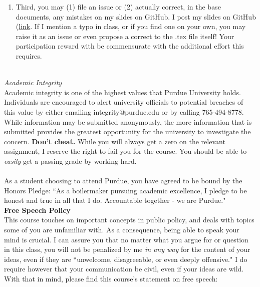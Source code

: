 \documentclass[a4paper]{article}
\begin{document}
\begin{itemize}
\begin{itemize}
\begin{enumerate}
\item Third, you may (1) file an issue or (2) actually correct, in the base documents, any mistakes on my slides on GitHub.  I post my slides on GitHub (\href{https://github.com/trevorsgallen/Intermediate-Macroeconomics}{link}.  If I mention a typo in class, or if you find one on your own, you may raise it as an issue or even propose a correct to the .tex file itself!  Your participation reward with be commensurate with the additional effort this requires.
\end{enumerate}
\end{itemize}
\end{itemize}
\ \\

\emph{Academic Integrity}\\
Academic integrity is one of the highest values that Purdue University holds. Individuals are encouraged to alert university officials to potential breaches of this value by either emailing integrity@purdue.edu or by calling 765-494-8778.  While information may be submitted anonymously, the more information that is submitted provides the greatest opportunity for the university to investigate the concern.  \textbf{Don't cheat.}  While you will always get a zero on the relevant assignment, I reserve the right to fail you for the course.  You should be able to \emph{easily} get a passing grade by working hard.   \\
\ \\
As a student choosing to attend Purdue, you have agreed to be bound by the Honors Pledge:  ``As a boilermaker pursuing academic excellence, I pledge to be honest and true in all that I do. Accountable together - we are Purdue."  \\

\clearpage
\textbf{Free Speech Policy}\\
This course touches on important concepts in public policy, and deals with topics some of you are unfamiliar with.  As a consequence, being able to speak your mind is crucial.  I can assure you that no matter what you argue for or question in this class, you will not be penalized by me \emph{in any way} for the content of your ideas, even if they are ``unwelcome, disagreeable, or even deeply offensive."  I do require however that your communication be civil, even if your ideas are wild.  With that in mind, please find this course's statement on free speech:\\
\end{document}
